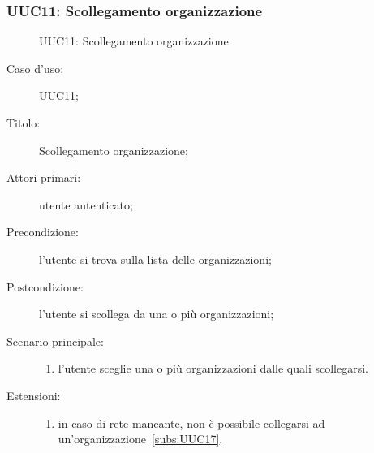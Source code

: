 \documentclass[../../../analisi-dei-requisiti.tex]{subfiles}
\begin{document}
\subsubsection{UUC11: Scollegamento organizzazione}%
\label{subs:UUC11}

\begin{figure}[H]
  \centering
  \caption{UUC11: Scollegamento organizzazione}%
  \label{fig:UUC11}
\end{figure}

\begin{description}
  \item[Caso d’uso:] UUC11;
  \item[Titolo:] Scollegamento organizzazione;
  \item[Attori primari:] utente autenticato;
  \item[Precondizione:] l'utente si trova sulla lista delle organizzazioni;
  \item[Postcondizione:] l'utente si scollega da una o più organizzazioni;
  \item[Scenario principale:]
        \begin{enumerate}
          \item l'utente sceglie una o più organizzazioni dalle quali scollegarsi.
        \end{enumerate}
  \item[Estensioni:]
        \begin{enumerate}
          \item in caso di rete mancante, non è possibile collegarsi ad un'organizzazione~\ref{subs:UUC17}.
        \end{enumerate}
\end{description}
\end{document}

